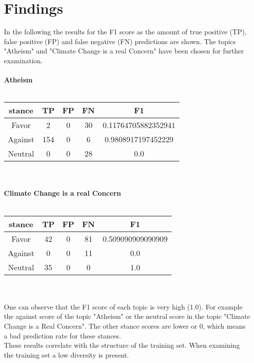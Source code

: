 \documentclass[a4paper,12pt,twoside]{article}
\begin{document}
\section{Findings}

In the following the results for the F1 score as the amount of true positive (TP), false positive (FP) and false negative (FN) predictions are shown. The topics "Atheism" and "Climate Change is a real Concern" have been chosen for further examination.\\
\\
\textbf{Atheism}\\
\\
\begin{tabular}{c|ccc|c}
stance & TP & FP & FN & F1\\ \hline
Favor & 2 & 0 & 30 & 0.11764705882352941\\
Against & 154 & 0 & 6 & 0.9808917197452229 \\
Neutral & 0 & 0 & 28 & 0.0 \\
\end{tabular}\\
\\
\textbf{Climate Change is a real Concern} \\
\\
\begin{tabular}{c|ccc|c}
stance & TP & FP & FN & F1\\ \hline
Favor & 42 & 0 & 81 & 0.509090909090909\\
Against & 0 & 0 & 11 & 0.0\\
Neutral & 35 & 0 & 0 & 1.0 \\
\end{tabular}\\
\\
One can observe that the F1 score of each topic is very high (1.0). For example the against score of the topic "Atheism" or the neutral score in the topic "Climate Change is a Real Concern". The other stance scores are lower or 0, which means a bad prediction rate for these stances.\\
These results correlate with the structure of the training set. When examining the training set a low diversity is present.\\
\end{document}
